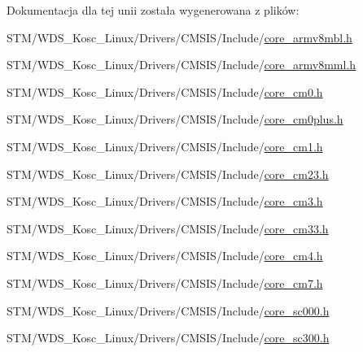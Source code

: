 Dokumentacja dla tej unii została wygenerowana z plików\+:\begin{DoxyCompactItemize}
\item 
S\+T\+M/\+W\+D\+S\+\_\+\+Kosc\+\_\+\+Linux/\+Drivers/\+C\+M\+S\+I\+S/\+Include/\hyperlink{core__armv8mbl_8h}{core\+\_\+armv8mbl.\+h}\item 
S\+T\+M/\+W\+D\+S\+\_\+\+Kosc\+\_\+\+Linux/\+Drivers/\+C\+M\+S\+I\+S/\+Include/\hyperlink{core__armv8mml_8h}{core\+\_\+armv8mml.\+h}\item 
S\+T\+M/\+W\+D\+S\+\_\+\+Kosc\+\_\+\+Linux/\+Drivers/\+C\+M\+S\+I\+S/\+Include/\hyperlink{core__cm0_8h}{core\+\_\+cm0.\+h}\item 
S\+T\+M/\+W\+D\+S\+\_\+\+Kosc\+\_\+\+Linux/\+Drivers/\+C\+M\+S\+I\+S/\+Include/\hyperlink{core__cm0plus_8h}{core\+\_\+cm0plus.\+h}\item 
S\+T\+M/\+W\+D\+S\+\_\+\+Kosc\+\_\+\+Linux/\+Drivers/\+C\+M\+S\+I\+S/\+Include/\hyperlink{core__cm1_8h}{core\+\_\+cm1.\+h}\item 
S\+T\+M/\+W\+D\+S\+\_\+\+Kosc\+\_\+\+Linux/\+Drivers/\+C\+M\+S\+I\+S/\+Include/\hyperlink{core__cm23_8h}{core\+\_\+cm23.\+h}\item 
S\+T\+M/\+W\+D\+S\+\_\+\+Kosc\+\_\+\+Linux/\+Drivers/\+C\+M\+S\+I\+S/\+Include/\hyperlink{core__cm3_8h}{core\+\_\+cm3.\+h}\item 
S\+T\+M/\+W\+D\+S\+\_\+\+Kosc\+\_\+\+Linux/\+Drivers/\+C\+M\+S\+I\+S/\+Include/\hyperlink{core__cm33_8h}{core\+\_\+cm33.\+h}\item 
S\+T\+M/\+W\+D\+S\+\_\+\+Kosc\+\_\+\+Linux/\+Drivers/\+C\+M\+S\+I\+S/\+Include/\hyperlink{core__cm4_8h}{core\+\_\+cm4.\+h}\item 
S\+T\+M/\+W\+D\+S\+\_\+\+Kosc\+\_\+\+Linux/\+Drivers/\+C\+M\+S\+I\+S/\+Include/\hyperlink{core__cm7_8h}{core\+\_\+cm7.\+h}\item 
S\+T\+M/\+W\+D\+S\+\_\+\+Kosc\+\_\+\+Linux/\+Drivers/\+C\+M\+S\+I\+S/\+Include/\hyperlink{core__sc000_8h}{core\+\_\+sc000.\+h}\item 
S\+T\+M/\+W\+D\+S\+\_\+\+Kosc\+\_\+\+Linux/\+Drivers/\+C\+M\+S\+I\+S/\+Include/\hyperlink{core__sc300_8h}{core\+\_\+sc300.\+h}\end{DoxyCompactItemize}
